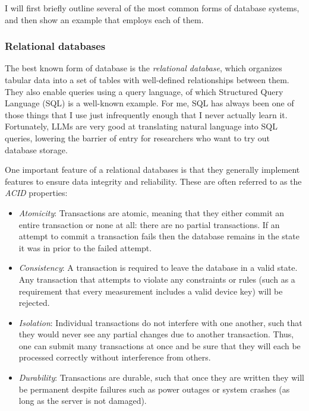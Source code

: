 I will first briefly outline several of the most common forms of database systems, and then show an example that employs each of them.

\subsubsection{Relational databases}

The best known form of database is the \textit{relational database}, which organizes tabular data into a set of tables with well-defined relationships between them.  They also enable queries using a query language, of which Structured Query Language (SQL) is a well-known example.  For me, SQL has always been one of those things that I use just infrequently enough that I never actually learn it.  Fortunately, LLMs are very good at translating natural language into SQL queries, lowering the barrier of entry for researchers who want to try out database storage.

One important feature of a relational databases is that they generally implement features to ensure data integrity and reliability.  These are often referred to as the \textit{ACID} properties:

\begin{itemize}
\item \textit{Atomicity}: Transactions are atomic, meaning that they either commit an entire transaction or none at all: there are no partial transactions.  If an attempt to commit a transaction fails then the database remains in the state it was in prior to the failed attempt.
\item \textit{Consistency}: A transaction is required to leave the database in a valid state.  Any transaction that attempts to violate any constraints or rules (such as a requirement that every measurement includes a valid device key) will be rejected.
\item \textit{Isolation}: Individual transactions do not interfere with one another, such that they would never see any partial changes due to another transaction.  Thus, one can submit many transactions at once and be sure that they will each be processed correctly without interference from others. 
\item \textit{Durability}:  Transactions are durable, such that once they are written they will be permanent despite failures such as power outages or system crashes (as long as the server is not damaged).
\end{itemize}


